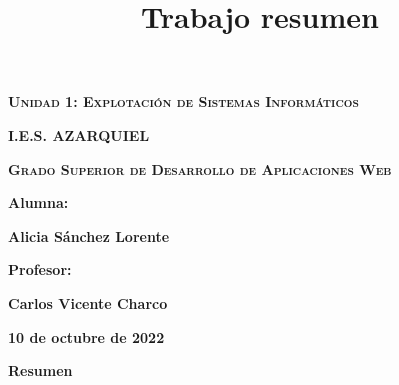 \documentclass{book}
\title{Trabajo resumen}
\begin{document}
\frontmatter


\begin{titlepage}
\begin{center}

\vspace*{6\baselineskip} %

{\scshape\Huge \textbf{Unidad 1: Explotación de Sistemas Informáticos } \par}

\vspace{3cm}

{\bfseries\LARGE I.E.S. AZARQUIEL }

\vspace{1cm}

{\scshape\Large  \textbf{Grado Superior de Desarrollo de Aplicaciones Web}\par}


{\Large \textbf{Alumna:} \par}
{\Large   \textbf{Alicia Sánchez Lorente} \par}
{\Large  \textbf{Profesor:} \par}
{\Large  \textbf {Carlos Vicente Charco}\par}
\vfill
{\Large  \textbf{10 de octubre de 2022} \par}

\end{center}
\end{titlepage}
 
\shipout\null

\newpage

\begin{center}
    \textbf{\LARGE Resumen}
    \end{center}
\end{document}
